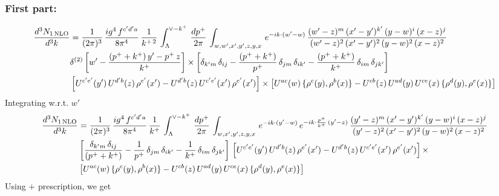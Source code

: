 \documentclass[9pt]{article}
\numberwithin{equation}{section}
\begin{document}
\subsubsection{First part:\,}
\begin{align}
     \frac{d^{3}N_{1\,\rm NLO}}{d^{3}k} & =  \frac{1}{(2\pi)^{3}}\,\frac{ig^{4}\,f^{c'd'a}}{8\pi^{4}}\, \frac{1}{k^{+\,2}}\,\int_{\Lambda}^{\vee-k^{+}}\, \frac{dp^{+}}{2\pi}\, \int_{w,w',x',y',z,y,x}\, e^{-ik\cdot (w'-w)}\, \frac{(w'-z)^{m}\,(x'-y')^{k'}\,(y-w)^{i}\,(x-z)^{j}}{(w'-z)^{2}\,(x'-y')^{2}\,(y-w)^{2}\,(x-z)^{2}}\notag \\ & \delta^{(2)}\left[w'-\frac{(p^{+}+k^{+})\,y'-p^{+}\,z}{k^{+}}\right]\times \left[\delta_{k'm}\,\delta_{ij}-\frac{(p^{+}+k^{+})}{p^{+}}\,\delta_{jm}\,\delta_{ik'}-\frac{(p^{+}+k^{+})}{k^{+}}\, \delta_{im}\, \delta_{jk'}\right]\notag \\ & \left[U^{c'e'}(y')\,U^{d'b}(z)\,\rho^{e'}(x')-U^{d'b}(z)\,U^{c'e'}(x')\,\rho^{e'}(x')\right]\times \left[U^{ac}(w)\, \{\rho^{c}(y),\rho^{b}(x)\}-U^{cb}(z)\,U^{ad}(y)\,U^{ce}(x)\,\{\rho^{d}(y),\rho^{e}(x)\}\right]
\end{align}
Integrating w.r.t. $w'$
\begin{align}
     \frac{d^{3}N_{1\,\rm NLO}}{d^{3}k} & = \frac{1}{(2\pi)^{3}}\, \frac{ig^{4}\,f^{c'd'a}}{8\pi^{4}}\, \frac{1}{k^{+}}\,\int_{\Lambda}^{\vee-k^{+}}\,  \frac{dp^{+}}{2\pi}\, \int_{w,x',y',z,y,x}\, e^{-ik\cdot (y'-w)}\, e^{-ik\cdot \frac{p^{+}}{k^{+}}\,(y'-z)}\,\frac{(y'-z)^{m}\,(x'-y')^{k'}\,(y-w)^{i}\,(x-z)^{j}}{(y'-z)^{2}\,(x'-y')^{2}\,(y-w)^{2}\,(x-z)^{2}}\notag \\ & \left[\frac{\delta_{k'm}\,\delta_{ij}}{(p^{+}+k^{+})}-\frac{1}{p^{+}}\,\delta_{jm}\,\delta_{ik'}-\frac{1}{k^{+}}\, \delta_{im}\, \delta_{jk'}\right]\, \left[U^{c'e'}(y')\,U^{d'b}(z)\,\rho^{e'}(x')-U^{d'b}(z)\,U^{c'e'}(x')\,\rho^{e'}(x')\right]\times\notag \\ &  \left[U^{ac}(w)\, \{\rho^{c}(y),\rho^{b}(x)\}-U^{cb}(z)\,U^{ad}(y)\,U^{ce}(x)\,\{\rho^{d}(y),\rho^{e}(x)\}\right]
\end{align} 
Using $+$ prescription, we get
\end{document}
